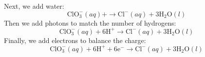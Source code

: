 \documentclass[12pt]{article}
\begin{document}
Next, we add water:
\begin{equation}
\mathrm{ClO}_{3}^{-}(a q) + \rightarrow \mathrm{Cl}^{-}(a q) + 3 \mathrm{H}_{2} \mathrm{O}(l)
\end{equation}
Then we add photons to match the number of hydrogens:
\begin{equation}
\mathrm{ClO}_{3}^{-}(a q) + 6 \mathrm{H}^{+} \rightarrow \mathrm{Cl}^{-}(a q) + 3 \mathrm{H}_{2} \mathrm{O}(l)
\end{equation}
Finally, we add electrons to balance the charge:
\begin{equation}
\mathrm{ClO}_{3}^{-}(a q) + 6 \mathrm{H}^{+} + 6 \mathrm{e}^{-} \rightarrow \mathrm{Cl}^{-}(a q) + 3 \mathrm{H}_{2} \mathrm{O}(l)
\end{equation}
\end{document}

